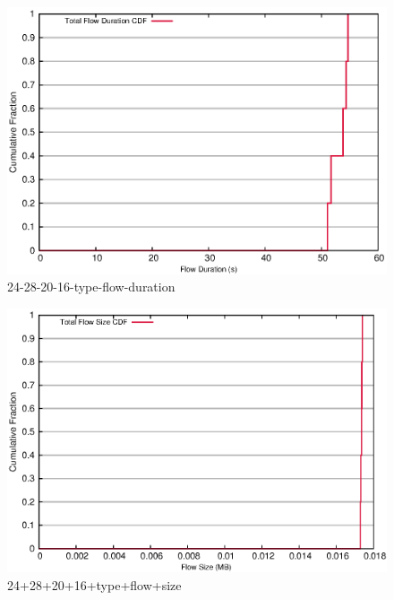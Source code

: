 \documentclass[landscape]{article}
\begin{document}
\begin{figure}[!hbt]
\centering
\includegraphics[width=1\textwidth]{24_28_20_16_type_flow_duration.eps}
\caption{24-28-20-16-type-flow-duration}

\end{figure}


\newpage

\begin{figure}[!hbt]
\centering
\includegraphics[width=1\textwidth]{24_28_20_16_type_flow_size.eps}
\caption{24+28+20+16+type+flow+size}

\end{figure}
\end{document}
